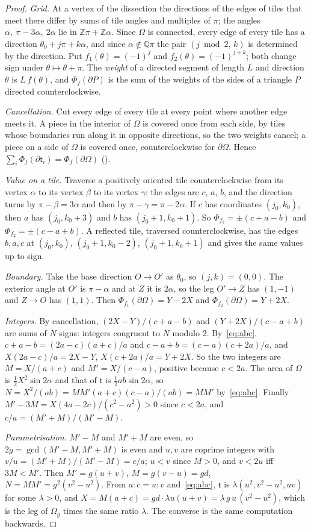 \documentclass[11pt,reqno]{amsart}
\theoremstyle{plain}
\theoremstyle{definition}
\newcommand{\Z}{\mathbb{Z}}
\newcommand{\Q}{\mathbb{Q}}
\begin{document}
\begin{proof}
\emph{Grid.} At a vertex of the dissection the directions of the edges of tiles that meet there differ by sums of tile angles and multiples of $\pi$; the angles $\alpha,\ \pi-3\alpha,\ 2\alpha$ lie in $\Z\pi+\Z\alpha$. Since $\Omega$ is connected, every edge of every tile has a direction $\theta_0+j\pi+k\alpha$, and since $\alpha\notin\Q\pi$ the pair $(j\bmod2,\,k)$ is determined by the direction. Put $f_1(\theta)=(-1)^j$ and $f_2(\theta)=(-1)^{j+k}$; both change sign under $\theta\mapsto\theta+\pi$. The \emph{weight} of a directed segment of length $L$ and direction $\theta$ is $L\,f(\theta)$, and $\Phi_f(\partial P)$ is the sum of the weights of the sides of a triangle $P$ directed counterclockwise.

\emph{Cancellation.} Cut every edge of every tile at every point where another edge meets it. A piece in the interior of $\Omega$ is covered once from each side, by tiles whose boundaries run along it in opposite directions, so the two weights cancel; a piece on a side of $\Omega$ is covered once, counterclockwise for $\partial\Omega$. Hence $\sum_i\Phi_f(\partial\mathsf t_i)=\Phi_f(\partial\Omega)$ ().

\emph{Value on a tile.} Traverse a positively oriented tile counterclockwise from its vertex $\alpha$ to its vertex $\beta$ to its vertex $\gamma$: the edges are $c$, $a$, $b$, and the direction turns by $\pi-\beta=3\alpha$ and then by $\pi-\gamma=\pi-2\alpha$. If $c$ has coordinates $(j_0,k_0)$, then $a$ has $(j_0,k_0+3)$ and $b$ has $(j_0+1,k_0+1)$. So $\Phi_{f_1}=\pm(c+a-b)$ and $\Phi_{f_2}=\pm(c-a+b)$. A reflected tile, traversed counterclockwise, has the edges $b,a,c$ at $(j_0,k_0)$, $(j_0+1,k_0-2)$, $(j_0+1,k_0+1)$ and gives the same values up to sign.

\emph{Boundary.} Take the base direction $O\to O'$ as $\theta_0$, so $(j,k)=(0,0)$. The exterior angle at $O'$ is $\pi-\alpha$ and at $Z$ it is $2\alpha$, so the leg $O'\to Z$ has $(1,-1)$ and $Z\to O$ has $(1,1)$. Then $\Phi_{f_1}(\partial\Omega)=Y-2X$ and $\Phi_{f_2}(\partial\Omega)=Y+2X$.

\emph{Integers.} By cancellation, $(2X-Y)/(c+a-b)$ and $(Y+2X)/(c-a+b)$ are sums of $N$ signs: integers congruent to $N$ modulo $2$. By~\eqref{eq:abc}, $c+a-b=(2a-c)(a+c)/a$ and $c-a+b=(c-a)(c+2a)/a$, and $X(2a-c)/a=2X-Y$, $X(c+2a)/a=Y+2X$. So the two integers are $M=X/(a+c)$ and $M'=X/(c-a)$, positive because $c<2a$. The area of $\Omega$ is $\tfrac12X^2\sin2\alpha$ and that of $\mathsf t$ is $\tfrac12ab\sin2\alpha$, so $N=X^2/(ab)=MM'(a+c)(c-a)/(ab)=MM'$ by~\eqref{eq:abc}. Finally $M'-3M=X(4a-2c)/(c^2-a^2)>0$ since $c<2a$, and $c/a=(M'+M)/(M'-M)$.

\emph{Parametrisation.} $M'-M$ and $M'+M$ are even, so $2g=\gcd(M'-M,M'+M)$ is even and $u,v$ are coprime integers with $v/u=(M'+M)/(M'-M)=c/a$; $u<v$ since $M>0$, and $v<2u$ iff $3M<M'$. Then $M'=g(u+v)$, $M=g(v-u)=gd$, $N=MM'=g^2(v^2-u^2)$. From $a:c=u:v$ and~\eqref{eq:abc}, $\mathsf t$ is $\lambda(u^2,v^2-u^2,uv)$ for some $\lambda>0$, and $X=M(a+c)=gd\cdot\lambda u(u+v)=\lambda\,g\,u\,(v^2-u^2)$, which is the leg of $\Omega_{g}$ times the same ratio $\lambda$. The converse is the same computation backwards.
\end{proof}
\end{document}
